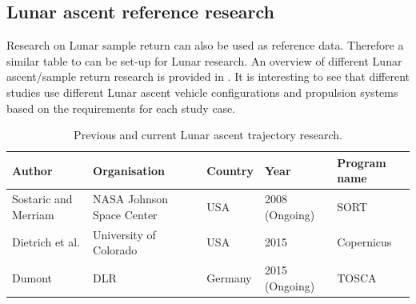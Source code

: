    






\subsection{Lunar ascent reference research}
\label{subsec:lunar_res}
Research on Lunar sample return can also be used as reference data. Therefore a similar table to  can be set-up for Lunar research. An overview of different Lunar ascent/sample return research is provided in . It is interesting to see that different studies use different Lunar ascent vehicle configurations and propulsion systems based on the requirements for each study case.

\begin{table}[!ht]
\begin{center}
\caption{Previous and current Lunar ascent trajectory research.}
\label{tab:moonascent_refres}
\begin{tabular}{|p{3cm}|p{3cm}|p{3cm}|l|l|}
\hline 
\textbf{Author} 	& \textbf{Organisation} & \textbf{Country} & \textbf{Year} & \textbf{Program name} \\ \hline \hline
Sostaric and Merriam \cite{sostaric2008lunar}& NASA Johnson Space Center & USA & 2008 (Ongoing) & SORT\\ \hline
Dietrich et al. \cite{dietrich2015ascent} & University of Colorado & USA & 2015 & Copernicus\\ \hline
Dumont \cite{dumont2015design} & \ac{DLR} 		& Germany & 2015 (Ongoing) & \acs{TOSCA} \\ \hline

\end{tabular}
\end{center}
\end{table}


